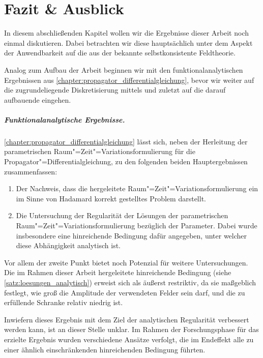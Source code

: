 \documentclass[../main.tex]{subfiles}
\begin{document}
\chapter{Fazit \& Ausblick} %
\label{chapter:ausblick}

In diesem abschließenden Kapitel wollen wir die Ergebnisse dieser Arbeit noch einmal diskutieren.
Dabei betrachten wir diese hauptsächlich unter dem Aspekt der Anwendbarkeit auf die aus der  bekannte selbstkonsistente Feldtheorie.

Analog zum Aufbau der Arbeit beginnen wir mit den funktionalanalytischen Ergebnissen aus \cref{chapter:propagator_differentialgleichung}, bevor wir weiter auf die zugrundeliegende Diskretisierung mittels  und zuletzt auf die darauf aufbauende  eingehen.

\paragraph{Funktionalanalytische Ergebnisse.} %
\label{par:funktionalanalytische_ergebnisse}

\cref{chapter:propagator_differentialgleichung} lässt sich, neben der Herleitung der parametrischen Raum"=Zeit"=Variationsformulierung für die Propagator"=Differentialgleichung, zu den folgenden beiden Hauptergebnissen zusammenfassen:

\begin{enumerate}[label={\itshape\roman*.},ref={\itshape\roman*}]
    \item
    Der Nachweis, dass die hergeleitete Raum"=Zeit"=Variationsformulierung ein im Sinne von Hadamard korrekt gestelltes Problem darstellt.
    \item
    Die Untersuchung der Regularität der Lösungen der parametrischen Raum"=Zeit"=Variationsformulierung bezüglich der Parameter.
    Dabei wurde insbesondere eine hinreichende Bedingung dafür angegeben, unter welcher diese Abhängigkeit analytisch ist.
\end{enumerate}

Vor allem der zweite Punkt bietet noch Potenzial für weitere Untersuchungen.
Die im Rahmen dieser Arbeit hergeleitete hinreichende Bedingung (siehe \cref{satz:loesungen_analytisch}) erweist sich als äußerst restriktiv, da sie maßgeblich festlegt, wie groß die Amplitude der verwendeten Felder sein darf, und die zu erfüllende Schranke relativ niedrig ist.

Inwiefern dieses Ergebnis mit dem Ziel der analytischen Regularität verbessert werden kann, ist an dieser Stelle unklar.
Im Rahmen der Forschungsphase für das erzielte Ergebnis wurden verschiedene Ansätze verfolgt, die im Endeffekt alle zu einer ähnlich einschränkenden hinreichenden Bedingung führten.
\end{document}
